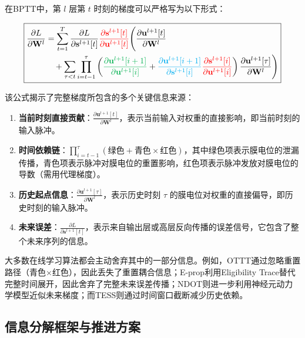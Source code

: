 \documentclass[journal,12pt,onecolumn]{IEEEtran}
\begin{document}
在BPTT中，第 \(l\) 层第 \(t\) 时刻的梯度可以严格写为以下形式：

\begin{equation}
\boxed{
\begin{aligned}
\frac{\partial L}{\partial \mathbf{W}^l}
&=
\sum_{t=1}^T
\frac{\partial L}{\partial \mathbf{s}^{l+1}[t]}
{\color{red}{\frac{\partial \mathbf{s}^{l+1}[t]}{\partial \mathbf{u}^{l+1}[t]}}}
\Bigg(
\frac{\partial \mathbf{u}^{l+1}[t]}{\partial \mathbf{W}^l}
\\
&\quad+
\sum_{\tau < t}
\prod_{i=t-1}^{\tau}
\left(
{\color[rgb]{0,0.69,0.31}{\frac{\partial \mathbf{u}^{l+1}[i+1]}{\partial \mathbf{u}^{l+1}[i]}}}
+
{\color{cyan}{\frac{\partial \mathbf{u}^{l+1}[i+1]}{\partial \mathbf{s}^{l+1}[i]}}}
{\color{red}{\frac{\partial \mathbf{s}^{l+1}[i]}{\partial \mathbf{u}^{l+1}[i]}}}
\right)
\frac{\partial \mathbf{u}^{l+1}[\tau]}{\partial \mathbf{W}^l}
\Bigg)
\end{aligned}
}
\end{equation}

该公式揭示了完整梯度所包含的多个关键信息来源：

\begin{enumerate}
    \item \textbf{当前时刻直接贡献}：\(\frac{\partial \mathbf{u}^{l+1}[t]}{\partial \mathbf{W}^l}\)，表示当前输入对权重的直接影响，即当前时刻的输入脉冲。
    \item \textbf{时间依赖链}：\(\prod_{i=t-1}^{\tau} \left( \text{绿色} + \text{青色}\times\text{红色} \right)\)，其中绿色项表示膜电位的泄漏传播，青色项表示脉冲对膜电位的重置影响，红色项表示脉冲发放对膜电位的导数（需用代理梯度）。
    \item \textbf{历史起点信息}：\(\frac{\partial \mathbf{u}^{l+1}[\tau]}{\partial \mathbf{W}^l}\)，表示历史时刻 \(\tau\) 的膜电位对权重的直接偏导，即历史时刻的输入脉冲。
    \item \textbf{未来误差}：\(\frac{\partial L}{\partial \mathbf{s}^{l+1}[t]}\)，表示来自输出层或高层反向传播的误差信号，它包含了整个未来序列的信息。
\end{enumerate}

大多数在线学习算法都会主动舍弃其中的一部分信息。例如，OTTT通过忽略重置路径（青色×红色），因此丢失了重置耦合信息；E-prop利用Eligibility Trace替代完整时间展开，因此舍弃了完整未来误差传播；NDOT则进一步利用神经元动力学模型近似未来梯度；而TESS则通过时间窗口截断减少历史依赖。

\subsection{信息分解框架与推进方案}
\end{document}
